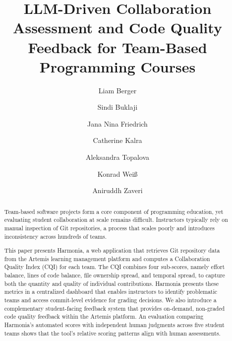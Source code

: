 \documentclass[sigconf]{acmart}
\begin{document}
\title{LLM-Driven Collaboration Assessment and Code Quality Feedback for Team-Based Programming Courses}

\author{Liam Berger}

\author{Sindi Buklaji}

\author{Jana Nina Friedrich}

\author{Catherine Kalra}

\author{Aleksandra Topalova}

\author{Konrad Wei\ss{}}

\author{Aniruddh Zaveri}

\renewcommand{\shortauthors}{Berger et al.}

\begin{abstract}
Team-based software projects form a core component of programming education, yet evaluating student collaboration at scale remains difficult. Instructors typically rely on manual inspection of Git repositories, a process that scales poorly and introduces inconsistency across hundreds of teams.

This paper presents Harmonia, a web application that retrieves Git repository data from the Artemis learning management platform and computes a Collaboration Quality Index (CQI) for each team. The CQI combines four sub-scores, namely effort balance, lines of code balance, file ownership spread, and temporal spread, to capture both the quantity and quality of individual contributions. Harmonia presents these metrics in a centralized dashboard that enables instructors to identify problematic teams and access commit-level evidence for grading decisions. We also introduce a complementary student-facing feedback system that provides on-demand, non-graded code quality feedback within the Artemis platform. An evaluation comparing Harmonia's automated scores with independent human judgments across five student teams shows that the tool's relative scoring patterns align with human assessments.
\end{abstract}
\end{document}
